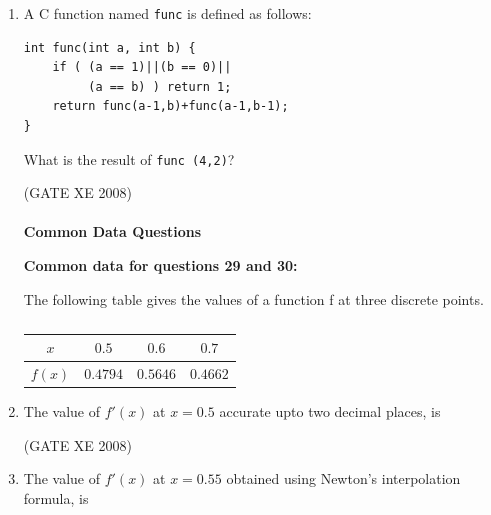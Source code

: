 \documentclass[12pt]{article}
\begin{document}
\begin{enumerate}
(GATE XE 2008)
\item A C function named \texttt{func} is defined as follows:
\begin{verbatim}
int func(int a, int b) {
    if ( (a == 1)||(b == 0)||
         (a == b) ) return 1;
    return func(a-1,b)+func(a-1,b-1);
}

\end{verbatim}
What is the result of \texttt{func (4,2)}?

\begin{enumerate}
\end{enumerate}

(GATE XE 2008)
\\
\\

\noindent \textbf{\large Common Data Questions}

\textbf{Common data for questions 29 and 30: }

The following table gives the values of a function f at three discrete points.

\begin{table}[H]     \centering     \caption{}     \label{}     \begin{tabular}{|c|c|c|c|}
    \hline
    $x$ & $0.5$ & $0.6$ & $0.7$ \\
    \hline
    $f(x)$ & $0.4794$ & $0.5646$ & $0.4662$ \\
    \hline
\end{tabular} \end{table}
\item The value of $f'(x)$ at $x = 0.5$ accurate upto two decimal places, is

\begin{enumerate}
\end{enumerate}

(GATE XE 2008)
\item  The value of $f'(x)$ at $x =0.55$ obtained using Newton's interpolation formula, is


\end{enumerate}
\end{document}
